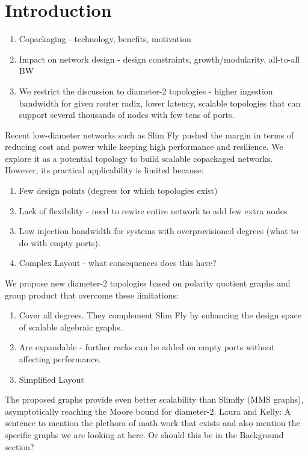 \section{Introduction}
\label{sec:intro}

\begin{enumerate}
    \item Copackaging - technology, benefits, motivation 
    \item Impact on network design - design constraints, growth/modularity, all-to-all BW
    \item We restrict the discussion to diameter-2 topologies - higher ingestion
bandwidth for given router radix, lower latency, scalable topologies that can support
several thousands of nodes with few tens of ports. 
\end{enumerate}

Recent low-diameter networks such as Slim Fly pushed the margin in terms of
reducing cost and power while keeping high performance and resilience.
We explore it as a potential topology to build scalable copackaged networks.
However, its practical applicability is limited because:
\begin{enumerate}
    \item Few design points (degrees for which topologies exist)
    \item Lack of flexibility - need to rewire entire network to add few extra nodes
    \item Low injection bandwidth for systems with overprovisioned degrees (what to do with empty ports).
    \item Complex Layout - what consequences does this have?
\end{enumerate} 


We propose new diameter-2 topologies based on polarity quotient graphs and 
group product that overcome these limitations:
\begin{enumerate}
    \item Cover all degrees. They complement Slim Fly 
        by enhancing the design space of scalable algebraic graphs.
    \item Are expandable - further racks can be added on empty ports without affecting performance.
    \item Simplified Layout
\end{enumerate}
The proposed graphs provide even better scalability than Slimfly (MMS graphs), 
asymptotically reaching the Moore bound for diameter-2.
{\color{red}Laura and Kelly: A sentence to mention the plethora of math work that exists and also mention the specific graphs we are looking at here. Or should this be in the Background section?}


 
